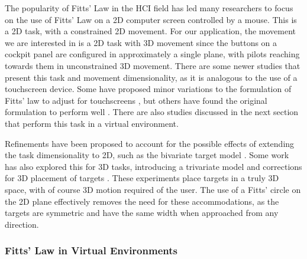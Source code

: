 The popularity of Fitts' Law in the HCI field has led many researchers to focus on the use of Fitts' Law on a 2D computer screen controlled by a mouse.
This is a 2D task, with a constrained 2D movement.
For our application, the movement we are interested in is a 2D task with 3D movement since the buttons on a cockpit panel are configured in approximately a single plane, with pilots reaching towards them in unconstrained 3D movement.
There are some newer studies that present this task and movement dimensionality, as it is analogous to the use of a touchscreen device.
Some have proposed minor variations to the formulation of Fitts' law to adjust for touchscreens \citep{bi_ffitts_2013,sears_high_1991}, but others have found the original formulation to perform well \citep{mackenzie_fitts_2015}.
There are also studies discussed in the next section that perform this task in a virtual environment.

Refinements have been proposed to account for the possible effects of extending the task dimensionality to 2D, such as the bivariate target model \citep{accot_refining_2003, mackenzie_extending_1992, wobbrock_error_2008}.
Some work has also explored this for 3D tasks, introducing a trivariate model \citep{grossman_pointing_2004} and corrections for 3D placement of targets \citep{cha_extended_2013, murata_extending_2001}.
These experiments place targets in a truly 3D space, with of course 3D motion required of the user.
The use of a Fitts' circle on the 2D plane effectively removes the need for these accommodations, as the targets are symmetric and have the same width when approached from any direction.

\subsubsection{Fitts' Law in Virtual Environments}\label{applying-fitts-to-virtual-environment}

